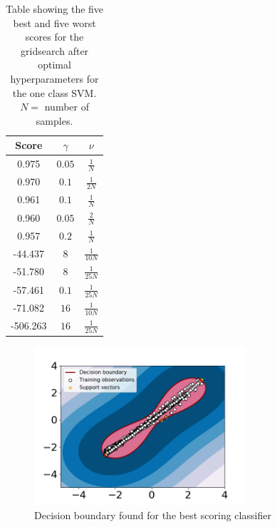                 \begin{table}[h]
                    \centering
                    \begin{tabular}{|c|c|c|}
                        \hline
                         Score  &   $\gamma$    & $\nu$         \\ \hline
                         0.975  &   $0.05$      & $\frac{1}{N}$ \\ \hline
                         0.970  &   $0.1$      & $\frac{1}{2N}$ \\ \hline
                         0.961  &   $0.1$      & $\frac{1}{N}$ \\ \hline
                         0.960  &   $0.05$      & $\frac{2}{N}$ \\ \hline
                         0.957  &   $0.2$       & $\frac{1}{N}$ \\ \hline
                         -44.437  &   $8$      & $\frac{1}{10N}$ \\ \hline
                         -51.780  &   $8$      & $\frac{1}{25N}$ \\ \hline
                         -57.461  &   $0.1$      & $\frac{1}{25N}$ \\ \hline
                         -71.082  &   $16$      & $\frac{1}{10N}$ \\ \hline
                         -506.263  &   $16$      & $\frac{1}{25N}$ \\ \hline
                         
                    \end{tabular}
                    \caption{Table showing the five best and five worst scores for the gridsearch after optimal hyperparameters for the one class SVM. $N = $ number of samples.}
                    \label{tab:svm_gridsearch}
                \end{table}
                
                \begin{figure}
                        \centering
                        \includegraphics[width=0.7\textwidth]{report/figures/analysis/gridsearch/Novelty detection, 1, training, gamma = 0.05 nu = 1.0583130489998942e-05.png}
                        \caption{Decision boundary found for the best scoring classifier}
                        \label{fig:svm_grid_best}
                        
                \end{figure}
                
